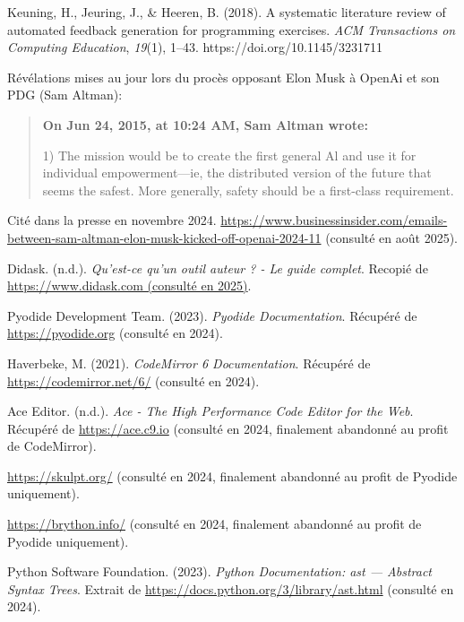 \begin{thebibliography}{99}
Keuning, H., Jeuring, J., \& Heeren, B. (2018).
A systematic literature review of automated feedback generation for programming exercises.
\textit{ACM Transactions on Computing Education}, \textit{19}(1), 1--43.
https://doi.org/10.1145/3231711

 Révélations mises au jour lors du procès opposant Elon Musk à OpenAi et son PDG (Sam Altman):
\begin{quote}
    \textbf{On Jun 24, 2015, at 10:24 AM, Sam Altman wrote:}

1) The mission would be to create the first general Al and use it for individual empowerment—ie, the distributed version of the future that seems the safest. More generally, safety should be a first-class requirement.
\end{quote} Cité dans la presse en novembre 2024. \url{https://www.businessinsider.com/emails-between-sam-altman-elon-musk-kicked-off-openai-2024-11} (consulté en août 2025).

 Didask. (n.d.). \textit{Qu'est-ce qu'un outil auteur ? - Le guide complet}. Recopié de \url{https://www.didask.com (consulté en 2025)}.

 Pyodide Development Team. (2023). \textit{Pyodide Documentation}. Récupéré de \url{https://pyodide.org} (consulté en 2024).

 Haverbeke, M. (2021). \textit{CodeMirror 6 Documentation}. Récupéré de \url{https://codemirror.net/6/} (consulté en 2024).

 Ace Editor. (n.d.). \textit{Ace - The High Performance Code Editor for the Web}. Récupéré de \url{https://ace.c9.io} (consulté en 2024, finalement abandonné au profit de CodeMirror).

 \url{https://skulpt.org/} (consulté en 2024, finalement abandonné au profit de Pyodide uniquement).

 \url{https://brython.info/} (consulté en 2024, finalement abandonné au profit de Pyodide uniquement).

 Python Software Foundation. (2023). \textit{Python Documentation: ast --- Abstract Syntax Trees}. Extrait de \url{https://docs.python.org/3/library/ast.html} (consulté en 2024).


\end{thebibliography}
